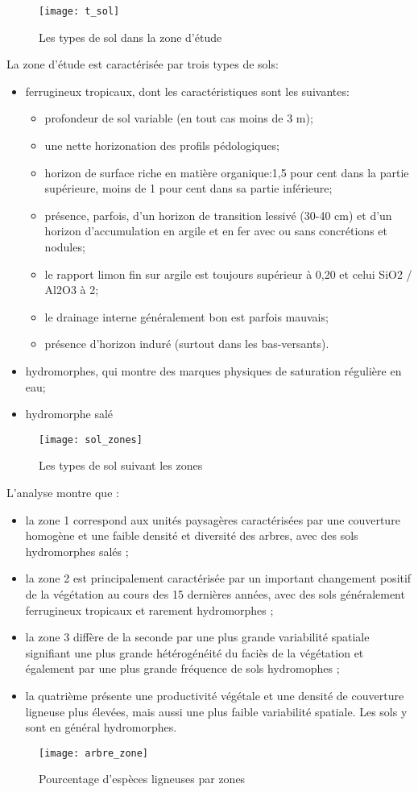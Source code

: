 \documentclass[a4paper, oneside, 12pt]{book}
\begin{document}
\begin{figure}[H]
	\centering
	\caption{Les types de sol dans la zone d'étude}
	\texttt{[image: t\_sol]}	
\end{figure}
La zone d'étude est caractérisée par trois types de sols:
\begin{itemize}
	\item ferrugineux tropicaux, dont les caractéristiques sont les suivantes:
	\begin{itemize}
		\item profondeur de sol variable (en tout cas moins de 3 m);
		\item une nette horizonation des profils pédologiques;
		\item horizon de surface riche en matière organique:1,5 pour cent dans la partie supérieure, moins de 1 pour cent dans sa partie inférieure;
		\item présence, parfois, d'un horizon de transition lessivé (30-40 cm) et d'un horizon d'accumulation en argile et en fer avec ou sans concrétions et nodules;
		\item le rapport limon fin sur argile est toujours supérieur à 0,20 et celui SiO2 / Al2O3 à 2;
		\item le drainage interne généralement bon est parfois mauvais;
		\item présence d'horizon induré (surtout dans les bas-versants).
	\end{itemize}
\item hydromorphes, qui montre des marques physiques de saturation régulière en eau;
\item hydromorphe salé
\end{itemize}
\begin{figure}[H]
	\centering
	\caption{Les types de sol suivant les zones}
	\texttt{[image: sol\_zones]}	
\end{figure}
L’analyse montre que :
\begin{itemize}
	\item la zone 1 correspond aux unités paysagères caractérisées par une couverture homogène et une faible densité et diversité des arbres, avec des sols hydromorphes salés ;
	\item la zone 2 est principalement caractérisée par un important changement positif de la végétation au cours des 15 dernières années, avec des sols généralement ferrugineux tropicaux et rarement hydromorphes ;
	\item la zone 3 diffère de la seconde par une plus grande variabilité spatiale signifiant une plus grande hétérogénéité du faciès de la végétation et également par une plus grande fréquence de sols hydromophes ;
	\item la quatrième présente une productivité végétale et une densité de couverture ligneuse plus élevées, mais aussi une plus faible variabilité spatiale. Les sols y sont en général hydromorphes.	
\end{itemize}
\begin{figure}[H]
	\centering
	\caption{Pourcentage d'espèces ligneuses par zones}
	\texttt{[image: arbre\_zone]}	
\end{figure}
\end{document}
